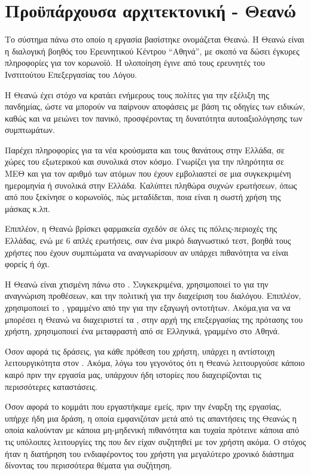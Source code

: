 \section{Προϋπάρχουσα αρχιτεκτονική - Θεανώ}

Το σύστημα πάνω στο οποίο η εργασία βασίστηκε ονομάζεται Θεανώ. H Θεανώ είναι η διαλογική βοηθός του Ερευνητικού Κέντρου “Αθηνά”, με σκοπό να δώσει έγκυρες πληροφορίες για τον κορωνοϊό. Η υλοποίηση έγινε από τους ερευνητές του Ινστιτούτου Επεξεργασίας του Λόγου.

Η Θεανώ έχει στόχο να κρατάει ενήμερους τους πολίτες για την εξέλιξη της πανδημίας, ώστε να μπορούν να παίρνουν αποφάσεις με βάση τις οδηγίες των ειδικών, καθώς και να μειώνει τον πανικό, προσφέροντας τη δυνατότητα αυτοαξιολόγησης των συμπτωμάτων.

Παρέχει πληροφορίες για τα νέα κρούσματα και τους θανάτους στην Ελλάδα, σε χώρες του εξωτερικού και συνολικά στον κόσμο. Γνωρίζει για την πληρότητα σε ΜΕΘ και για τον αριθμό των ατόμων που έχουν εμβολιαστεί σε μια συγκεκριμένη ημερομηνία ή συνολικά στην Ελλάδα. Καλύπτει πληθώρα συχνών ερωτήσεων, όπως από που ξεκίνησε ο κορωνοϊός, πώς μεταδίδεται, ποια είναι η σωστή χρήση της μάσκας κ.λπ.

Επιπλέον, η Θεανώ βρίσκει φαρμακεία σχεδόν σε όλες τις πόλεις-περιοχές της Ελλάδας, ενώ με 6 απλές ερωτήσεις, σαν ένα μικρό διαγνωστικό τεστ, βοηθά τους χρήστες που έχουν συμπτώματα να αναγνωρίσουν αν υπάρχει πιθανότητα να είναι φορείς ή όχι.

H Θεανώ είναι χτισμένη πάνω στο . Συγκεκριμένα, χρησιμοποιεί το  για την αναγνώριση προθέσεων, και την πολιτική  για την διαχείριση του διαλόγου. Επιπλέον, χρησιμοποιεί το , γραμμένο από την  για την εξαγωγή οντοτήτων. Ακόμα,για να να μπορέσει η Θεανώ να διαχειριστεί τα , στην αρχή της επεξεργασίας της πρότασης του χρήστη, χρησιμοποιεί ένα μεταφραστή από  σε Ελληνικά, γραμμένο στο Αθηνά.


Όσον αφορά τις δράσεις, για κάθε πρόθεση του χρήστη, υπάρχει η αντίστοιχη λειτουργικότητα στον . Ακόμα, λόγω του γεγονότος ότι η Θεανώ λειτουργούσε κάποιο καιρό πριν την εργασία μας, υπάρχουν ήδη ιστορίες που διαχειρίζονται τις περισσότερες καταστάσεις.

Όσον αφορά το κομμάτι που εργαστήκαμε εμείς, πριν την έναρξη της εργασίας, υπήρχε ήδη μια δράση, η οποία εμφανιζόταν μετά από τις απαντήσεις της Θεανώς η οποία καλούνταν με κάποια μη-μηδενική πιθανότητα και τυχαία πρότεινε κάποια από τις υπόλοιπες λειτουργίες της που δεν είχαν συζητηθεί με τον χρήστη ακόμα. Ο στόχος ήταν η διατήρηση του ενδιαφέροντος του χρήστη για μεγαλύτερο χρονικό διάστημα δίνοντας του περισσότερα θέματα για συζήτηση.

